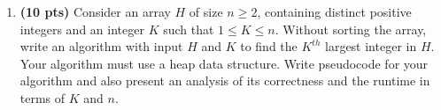 \documentclass[12pt]{article}
\newif\ifans
\begin{document}
\begin{enumerate}
\begin{enumerate}
        \item \textbf{(5 pts)} Is an array that is sorted in increasing order a min heap? Justify your answer with an explanation.

        \ifans
        \color{blue}
        \color{black}
        \fi
    
        \hfill\break
    \end{enumerate}

    \hfill\break

    \item \textbf{(10 pts)} Consider an array $H$ of size $n \geq 2$, containing distinct positive integers and an integer $K$ such that $1 \leq K \leq n$. Without sorting the array, write an algorithm with input $H$ and $K$ to find the $K^{th}$ largest integer in $H$. Your algorithm must use a heap data structure. Write pseudocode for your algorithm and also present an analysis of its correctness and the runtime in terms of $K$ and $n$. 
\end{enumerate}
\end{document}

